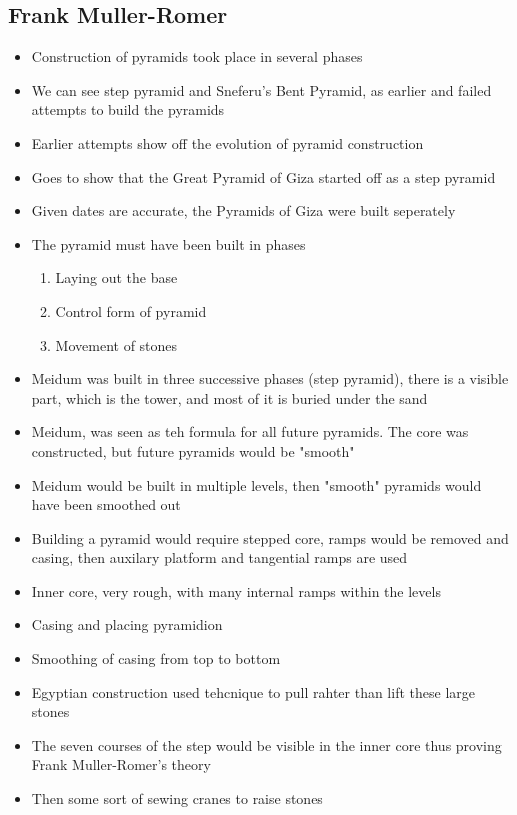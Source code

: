 \documentclass{article}
\begin{document}
\subsection{Frank Muller-Romer}
\begin{itemize}
  \item Construction of pyramids took place in several phases
  \item We can see step pyramid and Sneferu's Bent Pyramid,
    as earlier and failed attempts to build the pyramids
  \item Earlier attempts show off the evolution of pyramid construction
  \item Goes to show that the Great Pyramid of Giza started off as a step pyramid
  \item Given dates are accurate, the Pyramids of Giza were built seperately
  \item The pyramid must have been built in phases
    \begin{enumerate}
      \item Laying out the base
      \item Control form of pyramid
      \item Movement of stones
    \end{enumerate}
  \item Meidum was built in three successive phases (step pyramid),
    there is a visible part, which is the tower, and
    most of it is buried under the sand
  \item Meidum, was seen as teh formula for all future pyramids.
    The core was constructed, but future pyramids would be "smooth"
  \item Meidum would be built in multiple levels, then "smooth" pyramids
    would have been smoothed out
  \item Building a pyramid would require stepped core, ramps would be removed and casing, then
    auxilary platform and tangential ramps are used
  \item Inner core, very rough, with many internal ramps within the levels
  \item Casing and placing pyramidion
  \item Smoothing of casing from top to bottom
  \item Egyptian construction used tehcnique to pull rahter
    than lift these large stones
  \item The seven courses of the step would be visible in the inner core
    thus proving Frank Muller-Romer's theory
  \item Then some sort of sewing cranes to raise stones
\end{itemize}
\end{document}

